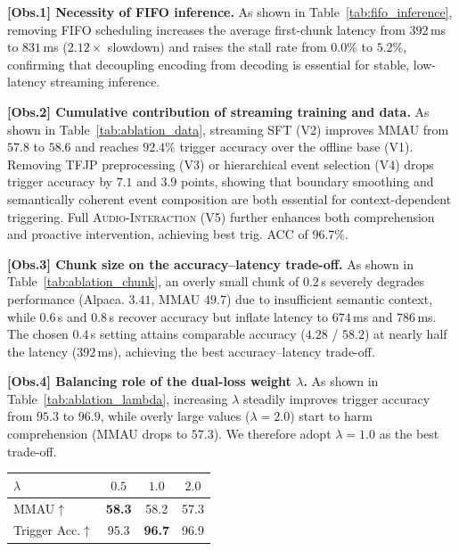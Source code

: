 \documentclass{llmxive}
\providecommand{\arraystretch}{1.0}
\begin{document}
\textbf{[Obs.1] Necessity of FIFO inference.} As shown in Table~\ref{tab:fifo_inference}, removing FIFO scheduling increases the average first-chunk latency from $392$\,ms to $831$\,ms ($2.12\times$ slowdown) and raises the stall rate from $0.0\%$ to $5.2\%$, confirming that decoupling encoding from decoding is essential for stable, low-latency streaming inference.

\textbf{[Obs.2] Cumulative contribution of streaming training and data.} As shown in Table~\ref{tab:ablation_data}, streaming SFT (V2) improves MMAU from $57.8$ to $58.6$ and reaches $92.4\%$ trigger accuracy over the offline base (V1). Removing TFJP preprocessing (V3) or hierarchical event selection (V4) drops trigger accuracy by $7.1$ and $3.9$ points, showing that boundary smoothing and semantically coherent event composition are both essential for context-dependent triggering. Full \textsc{Audio-Interaction} (V5) further enhances both comprehension and proactive intervention, achieving best trig. ACC of $96.7\%$.

\textbf{[Obs.3] Chunk size on the accuracy--latency trade-off.} As shown in Table~\ref{tab:ablation_chunk}, an overly small chunk of $0.2$\,s severely degrades performance (Alpaca. $3.41$, MMAU $49.7$) due to insufficient semantic context, while $0.6$\,s and $0.8$\,s recover accuracy but inflate latency to $674$\,ms and $786$\,ms. The chosen $0.4$\,s setting attains comparable accuracy ($4.28$ / $58.2$) at nearly half the latency ($392$\,ms), achieving the best accuracy--latency trade-off.

\vspace{-3mm}
\begin{minipage}[t]{0.61\textwidth}
\vspace{0mm}
\textbf{[Obs.4] Balancing role of the dual-loss weight $\lambda$.} As shown in Table~\ref{tab:ablation_lambda}, increasing $\lambda$ steadily improves trigger accuracy from $95.3$ to $96.9$, while overly large values ($\lambda{=}2.0$) start to harm comprehension (MMAU drops to $57.3$). We therefore adopt $\lambda{=}1.0$ as the best trade-off.
\end{minipage}
\hfill
\begin{minipage}[t]{0.40\textwidth}
\centering
\small
\setlength{\tabcolsep}{5pt}
\renewcommand{\arraystretch}{0.85}
\vspace{-2mm}
\label{tab:ablation_lambda}
\begin{tabular}{@{}lccc@{}}
\toprule
$\lambda$               & $0.5$  & $1.0$  & $2.0$  \\
\midrule
MMAU$\uparrow$          &\textbf{ 58.3 }  & 58.2   & 57.3   \\
Trigger Acc.$\uparrow$   & 95.3   & \textbf{96.7}   & 96.9   \\
\bottomrule
\end{tabular}
\end{minipage}
\end{document}
